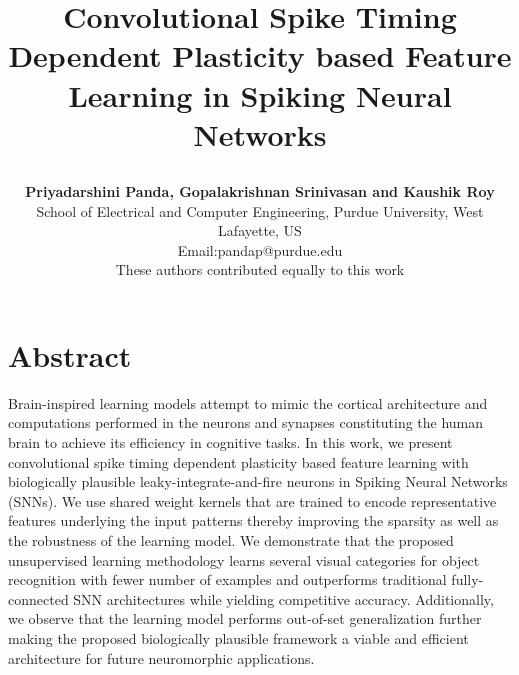 \documentclass[journal, onecolumn]{IEEEtran}
\begin{document}
\title{
\begin{flushleft}
Convolutional Spike Timing Dependent Plasticity based Feature Learning in Spiking Neural Networks
\end{flushleft}
}

\author{\begin{flushleft}
\textbf{Priyadarshini Panda, Gopalakrishnan Srinivasan and Kaushik Roy}\\
School of Electrical and Computer Engineering, Purdue University, West Lafayette, US\\
Email:pandap@purdue.edu\\
These authors contributed equally to this work
\end{flushleft}

\vspace{-2.0ex}
}




\maketitle
\thispagestyle{plain}
\pagestyle{plain}




\vspace{-5.0ex}

\section*{\large\bf{Abstract}}
Brain-inspired learning models attempt to mimic the cortical architecture and computations performed in the neurons and synapses constituting the human brain to achieve its efficiency in cognitive tasks. In this work, we present convolutional spike timing dependent plasticity based feature learning with biologically plausible leaky-integrate-and-fire neurons in Spiking Neural Networks (SNNs). We use shared weight kernels that are trained to encode representative features underlying the input patterns thereby improving the sparsity as well as the robustness of the learning model. We demonstrate that the proposed unsupervised learning methodology learns several visual categories for object recognition with fewer number of examples and outperforms traditional fully-connected SNN architectures while yielding competitive accuracy. Additionally, we observe that the learning model performs out-of-set generalization further making the proposed biologically plausible framework a viable and efficient architecture for future neuromorphic applications.
\end{document}
